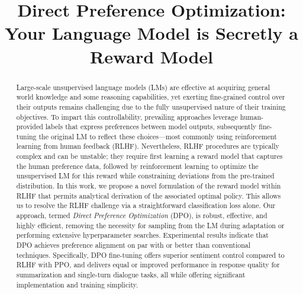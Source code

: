 \title{Direct Preference Optimization: Your Language Model is Secretly a Reward Model}

\begin{abstract}
Large-scale unsupervised language models (LMs) are effective at acquiring general world knowledge and some reasoning capabilities, yet exerting fine-grained control over their outputs remains challenging due to the fully unsupervised nature of their training objectives. To impart this controllability, prevailing approaches leverage human-provided labels that express preferences between model outputs, subsequently fine-tuning the original LM to reflect these choices—most commonly using reinforcement learning from human feedback (RLHF). Nevertheless, RLHF procedures are typically complex and can be unstable; they require first learning a reward model that captures the human preference data, followed by reinforcement learning to optimize the unsupervised LM for this reward while constraining deviations from the pre-trained distribution. In this work, we propose a novel formulation of the reward model within RLHF that permits analytical derivation of the associated optimal policy. This allows us to resolve the RLHF challenge via a straightforward classification loss alone. Our approach, termed \textit{Direct Preference Optimization} (DPO), is robust, effective, and highly efficient, removing the necessity for sampling from the LM during adaptation or performing extensive hyperparameter searches. Experimental results indicate that DPO achieves preference alignment on par with or better than conventional techniques. Specifically, DPO fine-tuning offers superior sentiment control compared to RLHF with PPO, and delivers equal or improved performance in response quality for summarization and single-turn dialogue tasks, all while offering significant implementation and training simplicity.
\end{abstract}

